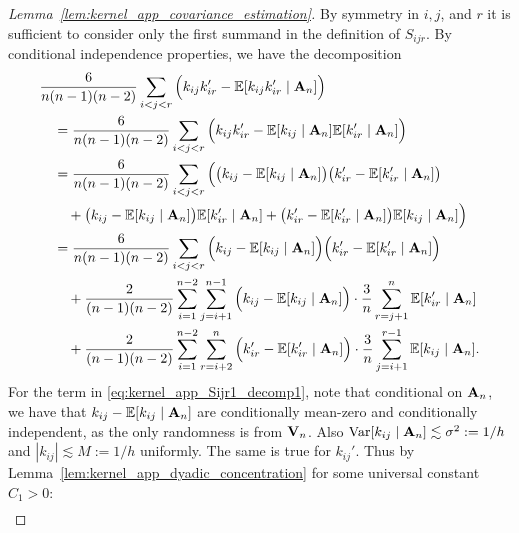 \begin{proof}[Lemma~\ref{lem:kernel_app_covariance_estimation}]
  By symmetry in $i, j$, and $r$
  it is sufficient to consider only the first summand
  in the definition of $S_{i j r}$.
  By conditional independence properties,
  we have the decomposition
  \begin{align}
    \nonumber
    &\frac{6}{n(n-1)(n-2)}
    \sum_{i<j<r}
    \Big(
      k_{i j}k_{i r}'
      - \mathbb{E}[k_{i j}k_{i r}' \mid \mathbf{A}_n]
    \Big) \\
    \nonumber
    &\quad=
    \frac{6}{n(n-1)(n-2)}
    \sum_{i<j<r}
    \Big(
      k_{i j}k_{i r}'
      - \mathbb{E}[k_{i j} \mid \mathbf{A}_n]
      \mathbb{E}[k_{i r}' \mid \mathbf{A}_n]
    \Big) \\
    \nonumber
    &\quad=
    \frac{6}{n(n-1)(n-2)}
    \sum_{i<j<r}
    \Big(
      \big(
        k_{i j}
        - \mathbb{E}[k_{i j} \mid \mathbf{A}_n]
      \big)
      \big(
        k_{i r}'
        - \mathbb{E}[k_{i r}' \mid \mathbf{A}_n]
      \big) \\
      \nonumber
      &\qquad+
      \big(
        k_{i j}
        - \mathbb{E}[k_{i j} \mid \mathbf{A}_n]
      \big)
      \mathbb{E}[k_{i r}' \mid \mathbf{A}_n]
      + \big(
        k_{i r}'
        - \mathbb{E}[k_{i r}' \mid \mathbf{A}_n]
      \big)
      \mathbb{E}[k_{i j} \mid \mathbf{A}_n]
    \Big) \\
    \label{eq:kernel_app_Sijr1_decomp1}
    &\quad=
    \frac{6}{n(n-1)(n-2)}
    \sum_{i<j<r}
    \Big(
      k_{i j}
      - \mathbb{E}[k_{i j} \mid \mathbf{A}_n]
    \Big)
    \Big(
      k_{i r}'
      - \mathbb{E}[k_{i r}' \mid \mathbf{A}_n]
    \Big) \\
    \label{eq:kernel_app_Sijr1_decomp2}
    &\qquad+
    \frac{2}{(n-1)(n-2)}
    \sum_{i=1}^{n-2}
    \sum_{j=i+1}^{n-1}
    \Big(
      k_{i j}
      - \mathbb{E}[k_{i j} \mid \mathbf{A}_n]
    \Big)
    \cdot \frac{3}{n}
    \sum_{r=j+1}^n
    \mathbb{E}[k_{i r}' \mid \mathbf{A}_n] \\
    \label{eq:kernel_app_Sijr1_decomp3}
    &\qquad+
    \frac{2}{(n-1)(n-2)}
    \sum_{i=1}^{n-2}
    \sum_{r=i+2}^n
    \Big(
      k_{i r}'
      - \mathbb{E}[k_{i r}' \mid \mathbf{A}_n]
    \Big)
    \cdot \frac{3}{n}
    \sum_{j=i+1}^{r-1}
    \mathbb{E}[k_{i j} \mid \mathbf{A}_n].
  \end{align}
  For the term in \eqref{eq:kernel_app_Sijr1_decomp1},
  note that conditional on $\mathbf{A}_n$,
  we have that
  $k_{i j} - \mathbb{E}[k_{i j} \mid \mathbf{A}_n]$
  are conditionally mean-zero
  and conditionally independent,
  as the only randomness is from $\mathbf{V}_n$.
  Also
  $\operatorname{Var}[k_{i j} \mid \mathbf{A}_n] \lesssim \sigma^2 := 1/h$
  and
  $|k_{i j}| \lesssim M := 1/h$
  uniformly.
  The same is true for $k_{i j}'$.
  Thus by Lemma~\ref{lem:kernel_app_dyadic_concentration}
  for some universal constant $C_1 > 0$:
  \begin{align*}

\end{align*}
\end{proof}
